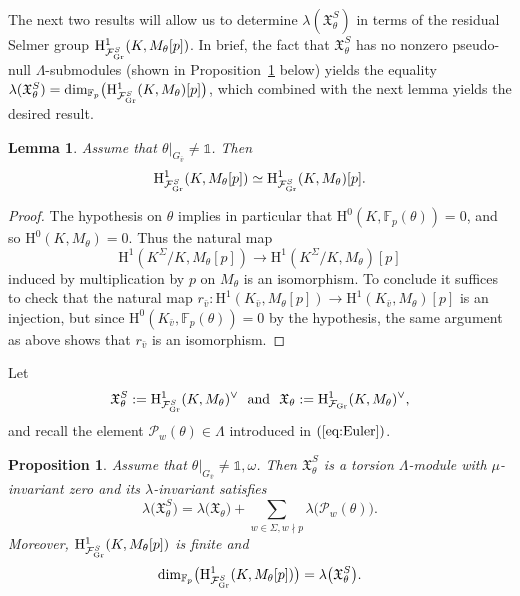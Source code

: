\documentclass[10pt]{amsart}
\numberwithin{equation}{section}
\newtheorem{lemma}[theorem]{Lemma}
\newtheorem{prop}[theorem]{Proposition}
\theoremstyle{definition}
\theoremstyle{remark}
\newcommand{\Fcal}{\mathcal{F}}
\newcommand{\rH}{\mathrm{H}}
\begin{document}
The next two results will allow us to determine $\lambda(\mathfrak{X}_\theta^S)$ in terms of the residual Selmer group $\rH^1_{\Fcal_{\rm Gr}^S}(K,M_\theta[p])$. In brief, the fact that $\mathfrak{X}_\theta^S$ has no nonzero pseudo-null $\Lambda$-submodules (shown in Proposition~\ref{propchar} below) yields the equality $\lambda(\mathfrak{X}_\theta^S)=\mathrm{dim}_{\mathbb{F}_p}\bigl(\rH^{1}_{\Fcal_{\rm Gr}^S}(K,M_\theta)[p]\bigr)$, which combined with the next lemma yields the desired result.

\begin{lemma}\label{rmkchar}
Assume that $\theta\vert_{G_{\bar{v}}}\neq\mathds{1}$. Then
\[
\rH^1_{\Fcal_{\rm Gr}^S}(K,M_\theta[p])\simeq
\rH^1_{\Fcal_{\rm Gr}^S}(K,M_\theta)[p].
\] 
\end{lemma}

\begin{proof}
The hypothesis on $\theta$ implies in particular that $\rH^0(K,\mathbb{F}_p(\theta))=0$, and so $\rH^0(K,M_\theta)=0$. Thus the natural map
\[
\rH^1(K^\Sigma/K,M_\theta[p])\rightarrow\rH^1(K^\Sigma/K,M_\theta)[p]
\]
induced by multiplication by $p$ on $M_\theta$ is an isomorphism. To conclude it suffices to check that the natural map $r_{\bar{v}}:\rH^1(K_{\bar{v}},M_\theta[p])\rightarrow\rH^1(K_{\bar{v}},M_\theta)[p]$ is an injection, but since $\rH^0(K_{\bar{v}},\mathbb{F}_p(\theta))=0$ by the hypothesis, the same argument as above shows that $r_{\bar{v}}$ is an isomorphism.
\end{proof}

Let
\[
\mathfrak{X}_\theta^S:=\rH^1_{\Fcal_{\rm Gr}^S}(K,M_\theta)^\vee \ \ \text{and} \ \ 
\mathfrak{X}_\theta:=\rH^1_{\Fcal_{\rm Gr}}(K,M_\theta)^\vee,
\]
and recall the element $\mathcal{P}_w(\theta)\in\Lambda$ introduced in $(\ref{eq:Euler})$.

\begin{prop}\label{propchar} 
Assume that $\theta\vert_{G_{\bar{v}}}\neq\mathds{1},\omega$. Then
$\mathfrak{X}_{\theta}^{S}$ is a torsion $\Lambda$-module with $\mu$-invariant zero and 
its $\lambda$-invariant satisfies
\begin{displaymath}
\lambda\bigl(\mathfrak{X}_{\theta}^{S}\bigr)=\lambda\bigl(\mathfrak{X}_{\theta}\bigr)+\sum_{w\in\Sigma, w\nmid p}\lambda\bigl(\mathcal{P}_w(\theta)\bigr).
\end{displaymath} 
Moreover, $\rH^{1}_{\Fcal^{S}_{\rm Gr}}(K,M_\theta[p])$ is finite and 
\[
\mathrm{dim}_{\mathbb{F}_p}\bigl(\rH^{1}_{\Fcal_{\rm Gr}^S}(K,M_\theta[p])\bigr)=\lambda\bigl(\mathfrak{X}_\theta^S\bigr).
\]
\end{prop}
\end{document}
